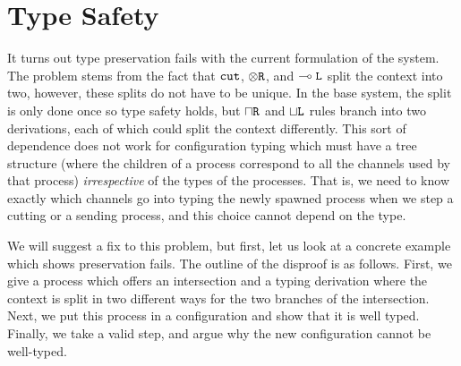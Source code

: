 
\section{Type Safety}
\label{refinements:semantics}

It turns out type preservation fails with the current formulation of the system. The problem stems from the fact that $\texttt{cut}$, $\otimes\texttt{R}$, and $\multimap\texttt{L}$ split the context into two, however, these splits do not have to be unique. In the base system, the split is only done once so type safety holds, but $\mathbin{\sqcap}\texttt{R}$ and $\mathbin{\sqcup}\texttt{L}$ rules branch into two derivations, each of which could split the context differently. This sort of dependence does not work for configuration typing which must have a tree structure (where the children of a process correspond to all the channels used by that process) \emph{irrespective} of the types of the processes. That is, we need to know exactly which channels go into typing the newly spawned process when we step a cutting or a sending process, and this choice cannot depend on the type.

We will suggest a fix to this problem, but first, let us look at a concrete example which shows preservation fails. The outline of the disproof is as follows. First, we give a process which offers an intersection and a typing derivation where the context is split in two different ways for the two branches of the intersection. Next, we put this process in a configuration and show that it is well typed. Finally, we take a valid step, and argue why the new configuration cannot be well-typed.

